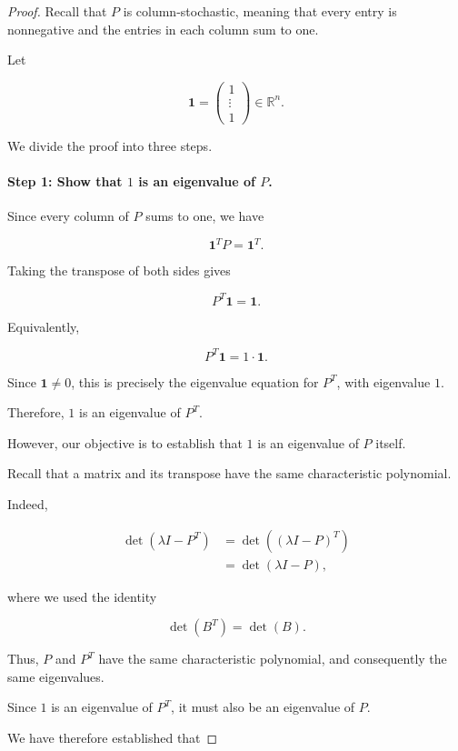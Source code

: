 \documentclass[11pt,a4paper]{article}
\theoremstyle{definition}
\theoremstyle{remark}
\begin{document}
\begin{proof}

Recall that $P$ is column-stochastic,
meaning that every entry is nonnegative
and the entries in each column sum to one.

Let

\[
\mathbf{1}=
\begin{pmatrix}
1\\
\vdots\\
1
\end{pmatrix}
\in\mathbb{R}^n.
\]

We divide the proof into three steps.

\paragraph{Step 1: Show that $1$ is an
eigenvalue of $P$.}

Since every column of $P$ sums to one,
we have

\[
\mathbf{1}^TP=\mathbf{1}^T.
\]

Taking the transpose of both sides gives

\[
P^T\mathbf{1}=\mathbf{1}.
\]

Equivalently,

\[
P^T\mathbf{1}=1\cdot\mathbf{1}.
\]

Since $\mathbf{1}\neq0$,
this is precisely the eigenvalue equation
for $P^T$, with eigenvalue $1$.

Therefore, $1$ is an eigenvalue of $P^T$.

However, our objective is to establish
that $1$ is an eigenvalue of $P$ itself.

Recall that a matrix and its transpose
have the same characteristic polynomial.

Indeed,

\[
\begin{aligned}
\det(\lambda I-P^T)
&=\det((\lambda I-P)^T)\\
&=\det(\lambda I-P),
\end{aligned}
\]

where we used the identity

\[
\det(B^T)=\det(B).
\]

Thus, $P$ and $P^T$ have
the same characteristic polynomial,
and consequently the same eigenvalues.

Since $1$ is an eigenvalue of $P^T$,
it must also be an eigenvalue of $P$.

We have therefore established that


\end{proof}
\end{document}
